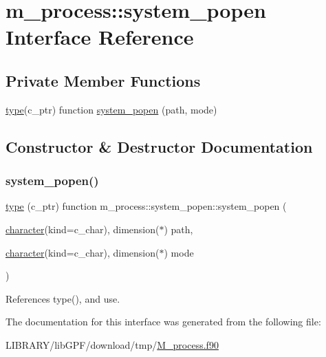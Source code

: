 \hypertarget{interfacem__process_1_1system__popen}{}\section{m\+\_\+process\+:\+:system\+\_\+popen Interface Reference}
\label{interfacem__process_1_1system__popen}
\subsection*{Private Member Functions}
\begin{DoxyCompactItemize}
\item 
\hyperlink{stop__watch_83_8txt_a70f0ead91c32e25323c03265aa302c1c}{type}(c\+\_\+ptr) function \hyperlink{interfacem__process_1_1system__popen_a45211cf49fdd755983b08ed6f3705bb1}{system\+\_\+popen} (path, mode)
\end{DoxyCompactItemize}


\subsection{Constructor \& Destructor Documentation}
\mbox{\label{interfacem__process_1_1system__popen_a45211cf49fdd755983b08ed6f3705bb1}} 
\subsubsection{\texorpdfstring{system\+\_\+popen()}{system\_popen()}}
{\footnotesize\ttfamily \hyperlink{stop__watch_83_8txt_a70f0ead91c32e25323c03265aa302c1c}{type} (c\+\_\+ptr) function m\+\_\+process\+::system\+\_\+popen\+::system\+\_\+popen (\begin{DoxyParamCaption}\item[{\hyperlink{option__stopwatch_83_8txt_abd4b21fbbd175834027b5224bfe97e66}{character}(kind=c\+\_\+char), dimension($\ast$)}]{path,  }\item[{\hyperlink{option__stopwatch_83_8txt_abd4b21fbbd175834027b5224bfe97e66}{character}(kind=c\+\_\+char), dimension($\ast$)}]{mode }\end{DoxyParamCaption})\hspace{0.3cm}{\ttfamily [private]}}



References type(), and use.



The documentation for this interface was generated from the following file\+:\begin{DoxyCompactItemize}
\item 
L\+I\+B\+R\+A\+R\+Y/lib\+G\+P\+F/download/tmp/\hyperlink{M__process_8f90}{M\+\_\+process.\+f90}\end{DoxyCompactItemize}
